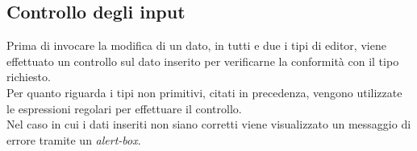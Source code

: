 \subsection{Controllo degli input}
Prima di invocare la modifica di un dato, in tutti e due i tipi di editor, viene effettuato un controllo sul dato inserito per verificarne la conformità con il tipo richiesto.\\
Per quanto riguarda i tipi non primitivi, citati in precedenza, vengono utilizzate le espressioni regolari per effettuare il controllo.\\
Nel caso in cui i dati inseriti non siano corretti viene visualizzato un messaggio di errore tramite un \textit{alert-box}.